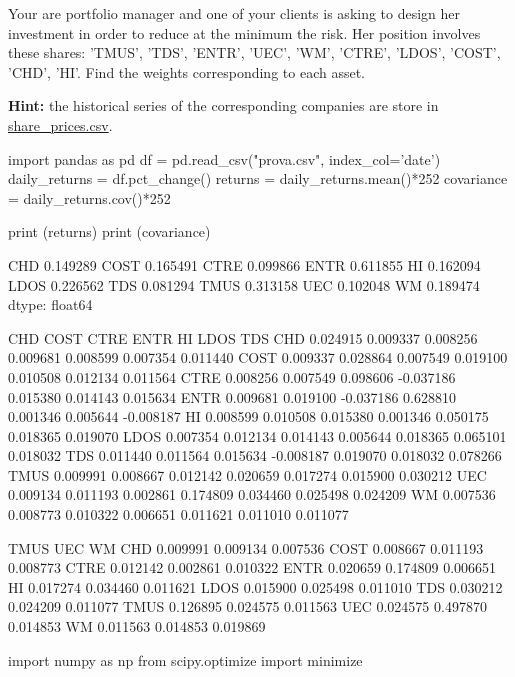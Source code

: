 \begin{question}
Your are portfolio manager and one of your clients is asking to design her investment in order to reduce at the minimum the risk. Her position involves these shares: 'TMUS', 'TDS', 'ENTR', 'UEC', 'WM', 'CTRE', 'LDOS', 'COST', 'CHD', 'HI'.
Find the weights corresponding to each asset.

\noindent\textbf{Hint:} the historical series of the corresponding companies are store in \href{https://drive.google.com/file/d/1ARryI7zpNVqlpzPsrNS2rTH9Knj07JBV/view?usp=sharing}{share\_prices.csv}.

\end{question}

\cprotEnv \begin{solution}
\begin{ipython}
import pandas as pd
df = pd.read_csv("prova.csv", index_col='date')
daily_returns = df.pct_change()
returns = daily_returns.mean()*252
covariance = daily_returns.cov()*252

print (returns)
print (covariance)

CHD 	0.149289
COST 	0.165491
CTRE 	0.099866
ENTR 	0.611855
HI 		0.162094
LDOS 	0.226562
TDS 	0.081294
TMUS 	0.313158
UEC 	0.102048
WM 		0.189474
dtype: float64

          CHD     COST      CTRE      ENTR       HI     LDOS       TDS
CHD  0.024915 0.009337  0.008256  0.009681 0.008599 0.007354  0.011440
COST 0.009337 0.028864  0.007549  0.019100 0.010508 0.012134  0.011564
CTRE 0.008256 0.007549  0.098606 -0.037186 0.015380 0.014143  0.015634
ENTR 0.009681 0.019100 -0.037186  0.628810 0.001346 0.005644 -0.008187
HI   0.008599 0.010508  0.015380  0.001346 0.050175 0.018365  0.019070
LDOS 0.007354 0.012134  0.014143  0.005644 0.018365 0.065101  0.018032
TDS  0.011440 0.011564  0.015634 -0.008187 0.019070 0.018032  0.078266
TMUS 0.009991 0.008667  0.012142  0.020659 0.017274 0.015900  0.030212
UEC  0.009134 0.011193  0.002861  0.174809 0.034460 0.025498  0.024209
WM   0.007536 0.008773  0.010322  0.006651 0.011621 0.011010  0.011077

         TMUS      UEC       WM
CHD  0.009991 0.009134 0.007536
COST 0.008667 0.011193 0.008773
CTRE 0.012142 0.002861 0.010322
ENTR 0.020659 0.174809 0.006651
HI   0.017274 0.034460 0.011621
LDOS 0.015900 0.025498 0.011010
TDS  0.030212 0.024209 0.011077
TMUS 0.126895 0.024575 0.011563
UEC  0.024575 0.497870 0.014853
WM   0.011563 0.014853 0.019869

import numpy as np
from scipy.optimize import minimize


\end{ipython}
\end{solution}

